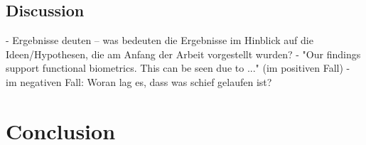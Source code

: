 \subsection{Discussion}

- Ergebnisse deuten -- was bedeuten die Ergebnisse im Hinblick auf die Ideen/Hypothesen, die am Anfang der Arbeit vorgestellt wurden?
- "Our findings support functional biometrics. This can be seen due to ..." (im positiven Fall)
- im negativen Fall: Woran lag es, dass was schief gelaufen ist?


\section{Conclusion}
